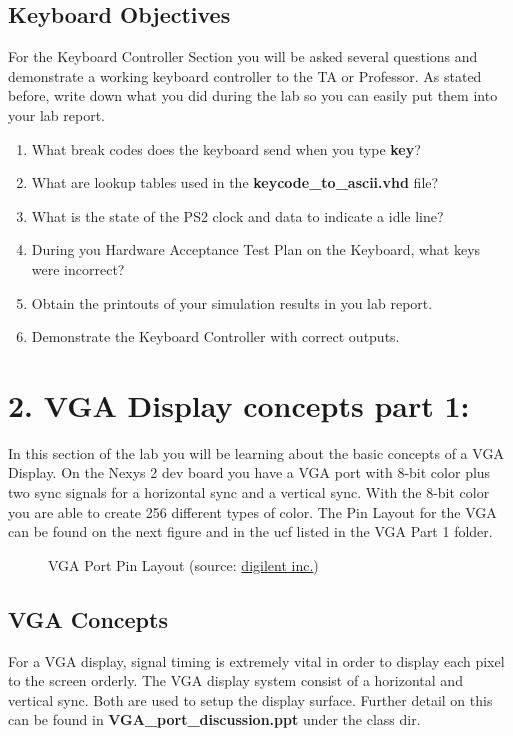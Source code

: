 \documentclass{article}
\begin{document}
\subsection{Keyboard Objectives}
For the Keyboard Controller Section you will be asked several questions and demonstrate a working keyboard controller to the TA or Professor. As stated before, write down what you did during the lab so you can easily put them into your lab report.

\begin{enumerate}
  \item What break codes does the keyboard send when you type \textbf{key}?
  \item What are lookup tables used in the \textbf{keycode\_to\_ascii.vhd} file?
  \item What is the state of the PS2 clock and data to indicate a idle line?
  \item During you Hardware Acceptance Test Plan on the Keyboard, what keys were incorrect?
  \item Obtain the printouts of your simulation results in you lab report.
  \item Demonstrate the Keyboard Controller with correct outputs.
\end{enumerate}

\newpage

\section{2. VGA Display concepts part 1:}
In this section of the lab you will be learning about the basic concepts of a VGA Display. On the Nexys 2 dev board you have a VGA port with 8-bit color plus two sync signals for a horizontal sync and a vertical sync. With the 8-bit color you are able to create 256 different types of color. The Pin Layout for the VGA can be found on the next figure and in the ucf listed in the VGA Part 1 folder.

\begin{figure}[!htbp]
  \centering
  \caption{VGA Port Pin Layout (source: \href{http://www.digilentinc.com/}{digilent inc.})}
\end{figure}

\subsection{VGA Concepts}
For a VGA display, signal timing is extremely vital in order to display each pixel to the screen orderly. The VGA display system consist of a horizontal and vertical sync. Both are used to setup the display surface. Further detail on this can be found in \textbf{VGA\_port\_discussion.ppt} under the class dir.
\end{document}
